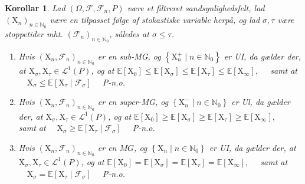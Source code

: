 \documentclass{article}
\newcommand{\1}{\mathbbm{1}}
\theoremstyle{boxed}
\newtheorem{corollary}[theorem]{Korollar}
\begin{document}
\begin{theorem-box}
    \begin{corollary}
        Lad $\left(\Omega, \mathcal{F}, \mathcal{F}_n, P\right)$ være et filtreret sandsynlighedsfelt, lad $\left(\mathrm{X}_n\right)_{n \in \mathbb{N}_0}$ være en tilpasset følge af stokastiske variable herpå, og lad $\sigma, \tau$ være stoppetider mht. $\left(\mathcal{F}_n\right)_{n \in \mathbb{N}_0}$, således at $\sigma \leq \tau$.
        \begin{enumerate}
            \item[\textnormal{(i)}] Hvis $\left(\mathrm{X}_n, \mathcal{F}_n\right)_{n \in \mathbb{N}_0}$ er en sub-MG, og $\left\{\mathrm{X}_n^{+} \mid n \in \mathbb{N}_0\right\}$ er UI, da gælder der, at $\mathrm{X}_\sigma, \mathrm{X}_\tau \in \mathcal{L}^1(P)$, og at
$\mathbb{E}\left[\mathrm{X}_0\right] \leq \mathbb{E}\left[\mathrm{X}_\sigma\right] \leq \mathbb{E}\left[\mathrm{X}_\tau\right] \leq \mathbb{E}\left[\mathrm{X}_{\infty}\right], \quad$ samt at $\quad \mathrm{X}_\sigma \leq \mathbb{E}\left[\mathrm{X}_\tau \mid \mathcal{F}_\sigma\right] \quad$ P-n.o.
            \item[\textnormal{(ii)}] Hvis $\left(\mathrm{X}_n, \mathcal{F}_n\right)_{n \in \mathbb{N}_0}$ er en super-MG, og $\left\{\mathrm{X}_n^{-} \mid n \in \mathbb{N}_0\right\}$ er Ul, da gælder der, at $\mathrm{X}_\sigma, \mathrm{X}_\tau \in \mathcal{L}^1(P)$, og at
$\mathbb{E}\left[\mathrm{X}_0\right] \geq \mathbb{E}\left[\mathrm{X}_\sigma\right] \geq \mathbb{E}\left[\mathrm{X}_\tau\right] \geq \mathbb{E}\left[\mathrm{X}_{\infty}\right], \quad$ samt at $\quad \mathrm{X}_\sigma \geq \mathbb{E}\left[\mathrm{X}_\tau \mid \mathcal{F}_\sigma\right] \quad$ P-n.o.
            \item[\textnormal{(iii)}] Hvis $\left(\mathrm{X}_n, \mathcal{F}_n\right)_{n \in \mathbb{N}_0}$ er en $M G$, og $\left\{\mathrm{X}_n \mid n \in \mathbb{N}_0\right\}$ er UI, da gælder der, at $\mathrm{X}_\sigma, \mathrm{X}_\tau \in \mathcal{L}^1(P)$, og at
$\mathbb{E}\left[\mathrm{X}_0\right]=\mathbb{E}\left[\mathrm{X}_\sigma\right]=\mathbb{E}\left[\mathrm{X}_\tau\right]=\mathbb{E}\left[\mathrm{X}_{\infty}\right], \quad$ samt at $\quad \mathrm{X}_\sigma=\mathbb{E}\left[\mathrm{X}_\tau \mid \mathcal{F}_\sigma\right] \quad$ P-n.o.
        \end{enumerate}
    \end{corollary}
\end{theorem-box}
\end{document}
